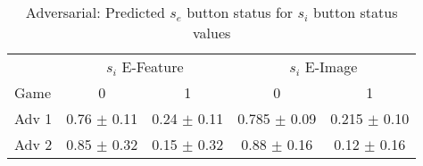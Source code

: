 
\begin{table}
\vskip -0.3in
\begin{center}
\caption{Adversarial: Predicted $s_e$ button status for $s_i$ button status values
}
\begin{tabular}{lcccc}\toprule
&  \multicolumn{2}{c}{$s_{i}$ E-Feature} & \multicolumn{2}{c}{$s_{i}$ E-Image}
\\\cmidrule(lr){2-3} \cmidrule(lr){4-5}
 Game  & 0 & 1 & 0 & 1 \\\midrule
Adv 1      & 0.76 $\pm$ 0.11   & 0.24 $\pm$ 0.11  & 0.785 $\pm$ 0.09 & 0.215 $\pm$ 0.10   \\
 \midrule
        Adv 2  & 0.85 $\pm$ 0.32 & 0.15 $\pm$ 0.32 & 0.88 $\pm$ 0.16 & 0.12 $\pm$ 0.16    \\
\bottomrule
\end{tabular}
\label{table:button_status}
\end{center}
\vskip -0.3in
\end{table}




